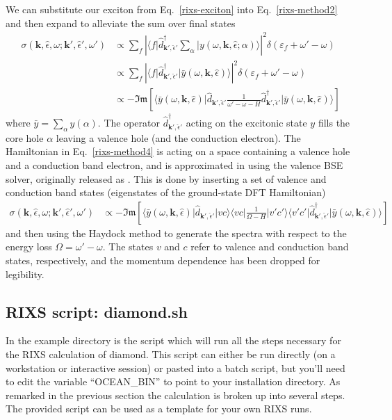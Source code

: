 \documentclass[11pt]{report}
\begin{document}
We can substitute our exciton from Eq.~\ref{rixs-exciton} into Eq.~\ref{rixs-method2} and then expand to alleviate the sum over final states
\begin{align}
\sigma( \mathbf{k}, \hat{\epsilon}, \omega; \mathbf{k}', \hat{\epsilon}', \omega' )
&\propto \sum_f \left|  \langle f \vert \hat{d}^\dagger_{\mathbf{k}', \hat{\epsilon}'} \sum_{\alpha}\vert  y(\omega,\mathbf{k}, \hat{\epsilon};\alpha) \rangle \right|^2 \delta( \varepsilon_f  + \omega'-\omega)
\label{rixs-method3}  \\
&\propto \sum_f \left|  \langle f \vert \hat{d}^\dagger_{\mathbf{k}', \hat{\epsilon}'}\vert  \bar{y}(\omega,\mathbf{k}, \hat{\epsilon}) \rangle \right|^2 \delta( \varepsilon_f  + \omega'-\omega)  \nonumber \\
&\propto -\mathfrak{Im} \left[ \langle \bar{y}(\omega,\mathbf{k}, \hat{\epsilon})  \vert  \hat{d}_{\mathbf{k}', \hat{\epsilon}'} \frac{1}{\omega'-\omega - H}  \hat{d}^\dagger_{\mathbf{k}', \hat{\epsilon}'} \vert  \bar{y}(\omega,\mathbf{k}, \hat{\epsilon}) \rangle \right]
\label{rixs-method4}
\end{align}
where $\bar{y} = \sum_\alpha y(\alpha)$. 
The operator $\hat{d}^\dagger_{\mathbf{k}', \hat{\epsilon}'}$ acting on the excitonic state $y$ fills the core hole $\alpha$ leaving a valence hole (and the conduction electron). 
The Hamiltonian in Eq.~\ref{rixs-method4} is acting on a space containing a valence hole and a conduction band electron, and is approximated in  using the valence BSE solver, originally released as . 
This is done by inserting a set of valence and conduction band states (eigenstates of the ground-state DFT Hamiltonian)
\begin{align}
\sigma( \mathbf{k}, \hat{\epsilon}, \omega; \mathbf{k}', \hat{\epsilon}', \omega' )
&\propto -\mathfrak{Im} \left[ \langle \bar{y}(\omega,\mathbf{k}, \hat{\epsilon})  \vert  \hat{d}_{\mathbf{k}', \hat{\epsilon}'} \vert vc \rangle \langle vc \vert  \frac{1}{\Omega - H}  \vert v'c' \rangle \langle v'c' \vert  \hat{d}^\dagger_{\mathbf{k}', \hat{\epsilon}'} \vert  \bar{y}(\omega,\mathbf{k}, \hat{\epsilon}) \rangle \right]
\label{rixs-haydock}
\end{align}
and then using the Haydock method to generate the spectra with respect to the energy loss $\Omega=\omega'-\omega$. 
The states $v$ and $c$ refer to valence and conduction band states, respectively, and the momentum dependence has been dropped for legibility.

\subsection{RIXS script: diamond.sh}
In the example directory is the script  which will run all the steps necessary for the RIXS calculation of diamond.
This script can either be run directly (on a workstation or interactive session) or pasted into a batch script,
but you'll need to edit the variable ``OCEAN\_BIN'' to point to your  installation directory.
As remarked in the previous section the calculation is broken up into several steps. 
The provided  script can be used as a template for your own RIXS runs.
\end{document}
